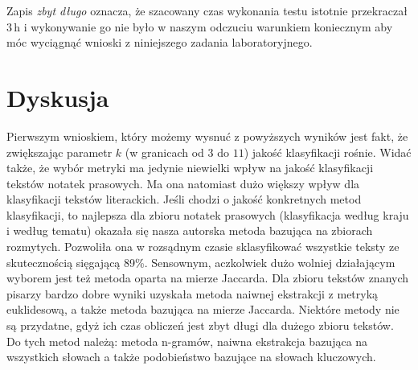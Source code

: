 \documentclass[a4paper]{classrep}
\begin{document}
\begin{table}[H]
\caption{Przybliżone czasy dla wybranego zestawu}
\end{table}

Zapis \emph{zbyt długo} oznacza, że szacowany czas wykonania testu istotnie przekraczał $3\,\mbox{h}$ i wykonywanie
go nie było w naszym odczuciu warunkiem koniecznym aby móc wyciągnąć wnioski z niniejszego zadania laboratoryjnego.

\section{Dyskusja}
Pierwszym wnioskiem, który możemy wysnuć z powyższych wyników jest fakt, że zwiększając parametr \(k\) (w granicach od \(3\) do \(11\)) jakość klasyfikacji rośnie. Widać także,
że wybór metryki ma jedynie niewielki wpływ na jakość klasyfikacji tekstów notatek prasowych. Ma ona natomiast dużo większy wpływ dla klasyfikacji tekstów literackich.
Jeśli chodzi o jakość konkretnych metod klasyfikacji, to najlepsza dla zbioru notatek prasowych (klasyfikacja według kraju i według tematu)
okazała się nasza autorska metoda bazująca na zbiorach rozmytych. Pozwoliła ona w rozsądnym czasie sklasyfikować wszystkie teksty ze skutecznością sięgającą 89\%. Sensownym, aczkolwiek
dużo wolniej działającym wyborem jest też metoda oparta na mierze Jaccarda.
Dla zbioru tekstów znanych pisarzy bardzo dobre wyniki uzyskała metoda naiwnej ekstrakcji z metryką euklidesową,
a także metoda bazująca na mierze Jaccarda. Niektóre metody nie są przydatne, gdyż ich czas obliczeń jest zbyt długi dla dużego zbioru tekstów. Do tych metod należą:
metoda n-gramów, naiwna ekstrakcja bazująca na wszystkich słowach a także podobieństwo bazujące na słowach kluczowych.
\end{document}

